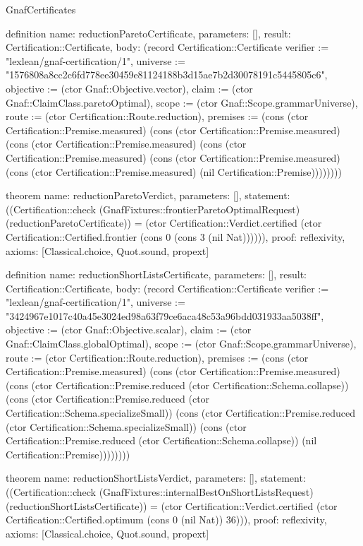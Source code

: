 \begin{lexlean}{GnafCertificates}
\begin{semanticmodule}
definition{
  name: reductionParetoCertificate,
  parameters: [],
  result: Certification::Certificate,
  body: (record Certification::Certificate {verifier := "lexlean/gnaf-certification/1", universe := "1576808a8cc2c6fd778ee30459e81124188b3d15ae7b2d30078191c5445805c6", objective := (ctor Gnaf::Objective.vector), claim := (ctor Gnaf::ClaimClass.paretoOptimal), scope := (ctor Gnaf::Scope.grammarUniverse), route := (ctor Certification::Route.reduction), premises := (cons (ctor Certification::Premise.measured) (cons (ctor Certification::Premise.measured) (cons (ctor Certification::Premise.measured) (cons (ctor Certification::Premise.measured) (cons (ctor Certification::Premise.measured) (cons (ctor Certification::Premise.measured) (nil Certification::Premise)))))))})
}

theorem{
  name: reductionParetoVerdict,
  parameters: [],
  statement: ((Certification::check (GnafFixtures::frontierParetoOptimalRequest) (reductionParetoCertificate)) = (ctor Certification::Verdict.certified (ctor Certification::Certified.frontier (cons 0 (cons 3 (nil Nat)))))),
  proof: reflexivity{},
  axioms: [Classical.choice, Quot.sound, propext]
}

definition{
  name: reductionShortListsCertificate,
  parameters: [],
  result: Certification::Certificate,
  body: (record Certification::Certificate {verifier := "lexlean/gnaf-certification/1", universe := "3424967e1017c40a45e3024ed98a63f79ce6aca48c53a96bdd031933aa5038ff", objective := (ctor Gnaf::Objective.scalar), claim := (ctor Gnaf::ClaimClass.globalOptimal), scope := (ctor Gnaf::Scope.grammarUniverse), route := (ctor Certification::Route.reduction), premises := (cons (ctor Certification::Premise.measured) (cons (ctor Certification::Premise.measured) (cons (ctor Certification::Premise.reduced (ctor Certification::Schema.collapse)) (cons (ctor Certification::Premise.reduced (ctor Certification::Schema.specializeSmall)) (cons (ctor Certification::Premise.reduced (ctor Certification::Schema.specializeSmall)) (cons (ctor Certification::Premise.reduced (ctor Certification::Schema.collapse)) (nil Certification::Premise)))))))})
}

theorem{
  name: reductionShortListsVerdict,
  parameters: [],
  statement: ((Certification::check (GnafFixtures::internalBestOnShortListsRequest) (reductionShortListsCertificate)) = (ctor Certification::Verdict.certified (ctor Certification::Certified.optimum (cons 0 (nil Nat)) 36))),
  proof: reflexivity{},
  axioms: [Classical.choice, Quot.sound, propext]
}


\end{semanticmodule}
\end{lexlean}
